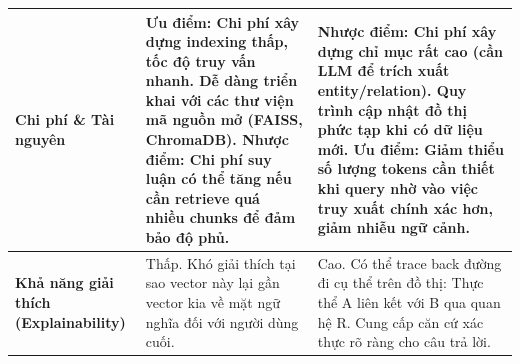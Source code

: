 \begin{longtable}{|>{\raggedright\arraybackslash}p{3cm}|>{\raggedright\arraybackslash}p{6cm}|>{\raggedright\arraybackslash}p{6cm}|}
\textbf{Chi phí \& Tài nguyên} & 
\textbf{Ưu điểm:} Chi phí xây dựng indexing thấp, tốc độ truy vấn nhanh. Dễ dàng triển khai với các thư viện mã nguồn mở (FAISS, ChromaDB). \newline
\textbf{Nhược điểm:} Chi phí suy luận có thể tăng nếu cần retrieve quá nhiều chunks để đảm bảo độ phủ. 
& 
\textbf{Nhược điểm:} Chi phí xây dựng chỉ mục rất cao (cần LLM để trích xuất entity/relation). Quy trình cập nhật đồ thị phức tạp khi có dữ liệu mới. \newline
\textbf{Ưu điểm:} Giảm thiểu số lượng tokens cần thiết khi query nhờ vào việc truy xuất chính xác hơn, giảm nhiễu ngữ cảnh. \\ \hline

\textbf{Khả năng giải thích (Explainability)} & 
Thấp. Khó giải thích tại sao vector này lại gần vector kia về mặt ngữ nghĩa đối với người dùng cuối. 
& 
Cao. Có thể trace back đường đi cụ thể trên đồ thị: Thực thể A liên kết với B qua quan hệ R. Cung cấp căn cứ xác thực rõ ràng cho câu trả lời. \\ \hline

\end{longtable}

\vspace{0.5em}
\noindent